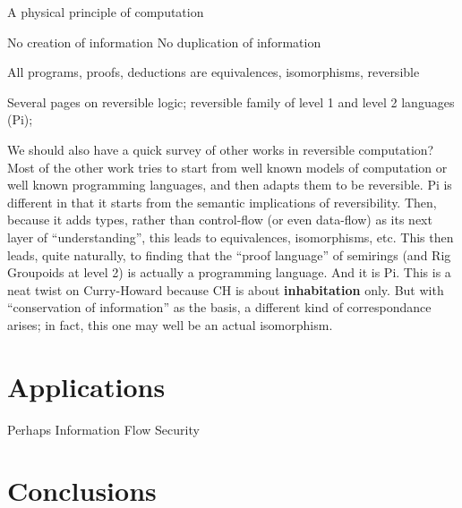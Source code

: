 \documentclass{article}
\newcommand{\jc}[1]{\fbox{Jacques says:} \textbf{#1}}
\begin{document}
A physical principle of computation

No creation of information
No duplication of information

All programs, proofs, deductions are equivalences, isomorphisms,
reversible

Several pages on reversible logic; reversible family of level 1 and
level 2 languages (Pi);

We should also have a quick survey of other works in reversible
computation? Most of the other work tries to start from well known
models of computation or well known programming languages, and then
adapts them to be reversible. Pi is different in that it starts from
the semantic implications of reversibility. Then, because it adds
types, rather than control-flow (or even data-flow) as its next layer
of ``understanding'', this leads to equivalences, isomorphisms, etc.
This then leads, quite naturally, to finding that the ``proof
language'' of semirings (and Rig Groupoids at level 2) is actually a
programming language. And it is Pi. This is a neat twist on
Curry-Howard because CH is about \textbf{inhabitation} only. But with
``conservation of information'' as the basis, a different kind of
correspondance arises; in fact, this one may well be an actual
isomorphism.

\section{Applications}

Perhaps Information Flow Security


\section{Conclusions}



\end{document}
